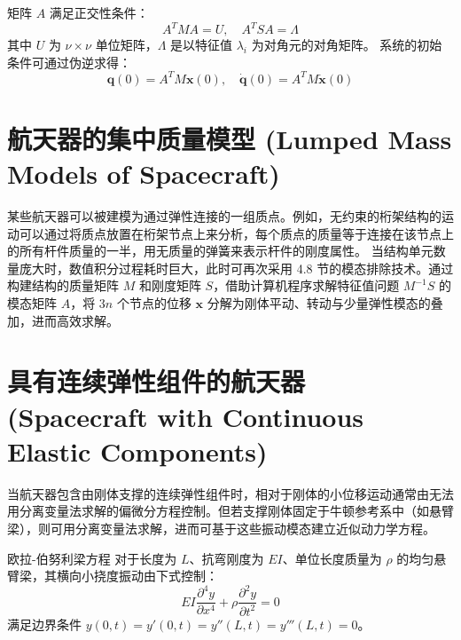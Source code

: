 矩阵 \(A\) 满足正交性条件：
\begin{equation}
A^T M A = U, \quad A^T S A = \Lambda \tag{11}
\end{equation}
其中 \(U\) 为 \(\nu \times \nu\) 单位矩阵，\(\Lambda\) 是以特征值 \(\lambda_i\) 为对角元的对角矩阵。
系统的初始条件可通过伪逆求得：
\begin{equation}
\mathbf{q}(0) = A^T M \mathbf{x}(0), \quad \dot{\mathbf{q}}(0) = A^T M \dot{\mathbf{x}}(0) \tag{6}
\end{equation}

\section{航天器的集中质量模型 (Lumped Mass Models of Spacecraft)}

某些航天器可以被建模为通过弹性连接的一组质点。例如，无约束的桁架结构的运动可以通过将质点放置在桁架节点上来分析，每个质点的质量等于连接在该节点上的所有杆件质量的一半，用无质量的弹簧来表示杆件的刚度属性。
当结构单元数量庞大时，数值积分过程耗时巨大，此时可再次采用 4.8 节的模态排除技术。通过构建结构的质量矩阵 \(M\) 和刚度矩阵 \(S\)，借助计算机程序求解特征值问题 \(M^{-1}S\) 的模态矩阵 \(A\)，将 \(3n\) 个节点的位移 \(\mathbf{x}\) 分解为刚体平动、转动与少量弹性模态的叠加，进而高效求解。
\newpage
\section{具有连续弹性组件的航天器 (Spacecraft with Continuous Elastic Components)}

当航天器包含由刚体支撑的连续弹性组件时，相对于刚体的小位移运动通常由无法用分离变量法求解的偏微分方程控制。但若支撑刚体固定于牛顿参考系中（如悬臂梁），则可用分离变量法求解，进而可基于这些振动模态建立近似动力学方程。

\begin{mydefinition}{欧拉-伯努利梁方程}
对于长度为 \(L\)、抗弯刚度为 \(EI\)、单位长度质量为 \(\rho\) 的均匀悬臂梁，其横向小挠度振动由下式控制：
\begin{equation}
EI\frac{\partial^4 y}{\partial x^4} + \rho\frac{\partial^2 y}{\partial t^2} = 0 \tag{1}
\end{equation}
满足边界条件 \(y(0,t)=y'(0,t)=y''(L,t)=y'''(L,t)=0\)。
\end{mydefinition}

